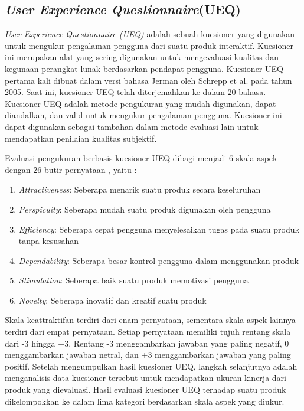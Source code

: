 \subsection{\textit{User Experience Questionnaire}(UEQ)}
\textit{User Experience Questionnaire (UEQ)} adalah sebuah kuesioner yang digunakan untuk mengukur pengalaman pengguna dari suatu produk interaktif.
Kuesioner ini merupakan alat yang sering digunakan untuk mengevaluasi kualitas dan kegunaan perangkat lunak berdasarkan pendapat pengguna. 
Kuesioner UEQ pertama kali dibuat dalam versi bahasa Jerman oleh Schrepp et al. pada tahun 2005.
Saat ini, kuesioner UEQ telah diterjemahkan ke dalam 20 bahasa. Kuesioner UEQ adalah metode pengukuran yang mudah digunakan, dapat diandalkan, dan valid untuk mengukur pengalaman pengguna.
Kuesioner ini dapat digunakan sebagai tambahan dalam metode evaluasi lain untuk mendapatkan penilaian kualitas subjektif.

Evaluasi pengukuran berbasis kuesioner UEQ dibagi menjadi 6 skala aspek 
dengan 26 butir pernyataan , yaitu :
\begin{enumerate}
	\item \textit{Attractiveness}: Seberapa menarik suatu produk secara keseluruhan 
	\item \textit{Perspicuity}:  Seberapa mudah suatu produk digunakan oleh pengguna 
	\item \textit{Efficiency}: Seberapa cepat pengguna menyelesaikan tugas pada suatu produk tanpa kesusahan 
	\item \textit{Dependability}: Seberapa besar kontrol pengguna dalam menggunakan produk  
	\item \textit{Stimulation}: Seberapa baik suatu produk memotivasi pengguna 
	\item \textit{Novelty}: Seberapa inovatif dan kreatif suatu produk 
\end{enumerate}
Skala keattraktifan terdiri dari enam pernyataan, sementara skala aspek lainnya terdiri dari empat pernyataan. Setiap pernyataan memiliki tujuh rentang skala dari -3 hingga +3. Rentang -3 menggambarkan jawaban yang paling negatif, 0 menggambarkan jawaban netral, dan +3 menggambarkan jawaban yang paling positif.
Setelah mengumpulkan hasil kuesioner UEQ, langkah selanjutnya adalah menganalisis data kuesioner tersebut untuk mendapatkan ukuran kinerja dari produk yang dievaluasi. Hasil evaluasi kuesioner UEQ terhadap suatu produk dikelompokkan ke dalam lima kategori berdasarkan skala aspek yang diukur.

